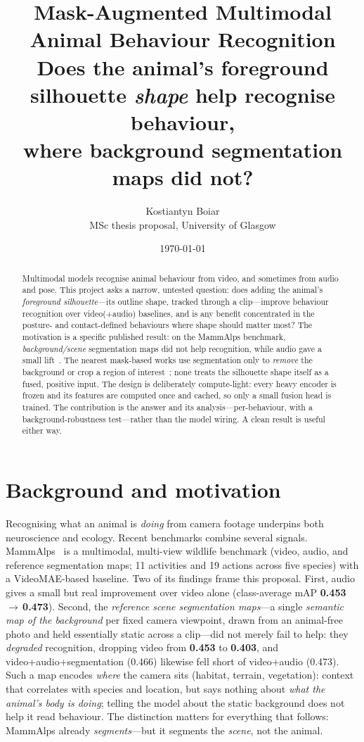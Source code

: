 \documentclass[11pt]{article}
\title{\textbf{Mask-Augmented Multimodal Animal Behaviour Recognition}\\[2pt]
\large Does the animal's foreground silhouette \emph{shape} help recognise behaviour,\\ where background segmentation maps did not?}
\author{Kostiantyn Boiar\\[2pt]
\small MSc thesis proposal, University of Glasgow}
\date{\today}
\begin{document}
\maketitle

\begin{abstract}
\noindent Multimodal models recognise animal behaviour from video, and sometimes from audio and pose. This project asks a narrow, untested question: does adding the animal's \emph{foreground silhouette}---its outline shape, tracked through a clip---improve behaviour recognition over video(+audio) baselines, and is any benefit concentrated in the posture- and contact-defined behaviours where shape should matter most? The motivation is a specific published result: on the MammAlps benchmark, \emph{background/scene} segmentation maps did not help recognition, while audio gave a small lift~\cite{mammalps}. The nearest mask-based works use segmentation only to \emph{remove} the background or crop a region of interest~\cite{panaf,maroon}; none treats the silhouette shape itself as a fused, positive input. The design is deliberately compute-light: every heavy encoder is frozen and its features are computed once and cached, so only a small fusion head is trained. The contribution is the answer and its analysis---per-behaviour, with a background-robustness test---rather than the model wiring. A clean result is useful either way.
\end{abstract}

\section{Background and motivation}
Recognising what an animal is \emph{doing} from camera footage underpins both neuroscience and ecology. Recent benchmarks combine several signals. MammAlps~\cite{mammalps} is a multimodal, multi-view wildlife benchmark (video, audio, and reference segmentation maps; 11 activities and 19 actions across five species) with a VideoMAE-based baseline. Two of its findings frame this proposal. First, audio gives a small but real improvement over video alone (class-average mAP \textbf{0.453}\,$\to$\,\textbf{0.473}). Second, the \emph{reference scene segmentation maps}---a single \emph{semantic map of the background} per fixed camera viewpoint, drawn from an animal-free photo and held essentially static across a clip---did not merely fail to help: they \emph{degraded} recognition, dropping video from \textbf{0.453} to \textbf{0.403}, and video+audio+segmentation (0.466) likewise fell short of video+audio (0.473). Such a map encodes \emph{where} the camera sits (habitat, terrain, vegetation): context that correlates with species and location, but says nothing about \emph{what the animal's body is doing}; telling the model about the static background does not help it read behaviour. The distinction matters for everything that follows: MammAlps already \emph{segments}---but it segments the \emph{scene}, not the animal.
\end{document}
